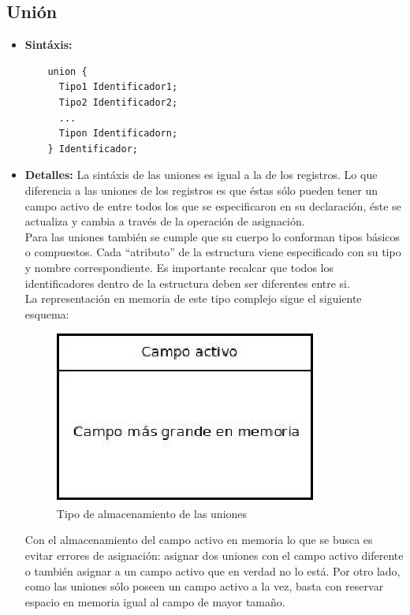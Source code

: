 \documentclass[11pt, spanish]{report}
\begin{document}
\subsection{Uni\'on}
\begin{itemize}
\item \textbf{Sint\'axis:}
  \begin{verbatim}
    union {
      Tipo1 Identificador1;
      Tipo2 Identificador2;
      ...
      Tipon Identificadorn;
    } Identificador;
  \end{verbatim}
\item \textbf{Detalles:}
  La sint\'axis de las uniones es igual a la de los registros. Lo que diferencia a las uniones de los registros es que \'estas s\'olo pueden tener 
  un campo activo de entre todos los que se especificaron en su declaraci\'on, \'este se actualiza y cambia a trav\'es de la operaci\'on de asignaci\'on. \\

  Para las uniones tambi\'en se cumple que su cuerpo lo conforman tipos b\'asicos o compuestos. Cada ``atributo'' de la estructura viene especificado 
  con su tipo y nombre correspondiente. Es importante recalcar que todos los identificadores dentro de la estructura deben ser diferentes entre si.\\

  La representaci\'on en memoria de este tipo complejo sigue el siguiente esquema:

  \begin{figure}[htp]
    \centering
    \mbox{\includegraphics[scale=0.5]{memoria3.jpg}}
    \caption{Tipo de almacenamiento de las uniones}
    \label{fig memoria3}
  \end{figure}

  Con el almacenamiento del campo activo en memoria lo que se busca es evitar errores de asignaci\'on: asignar dos uniones con el campo activo diferente o también asignar a un campo activo que en verdad no lo est\'a. Por otro lado, como las uniones s\'olo poseen 
  un campo activo a la vez, basta con reservar espacio en memoria igual al campo de mayor tama\~no.\\
  

\end{itemize}
\end{document}
